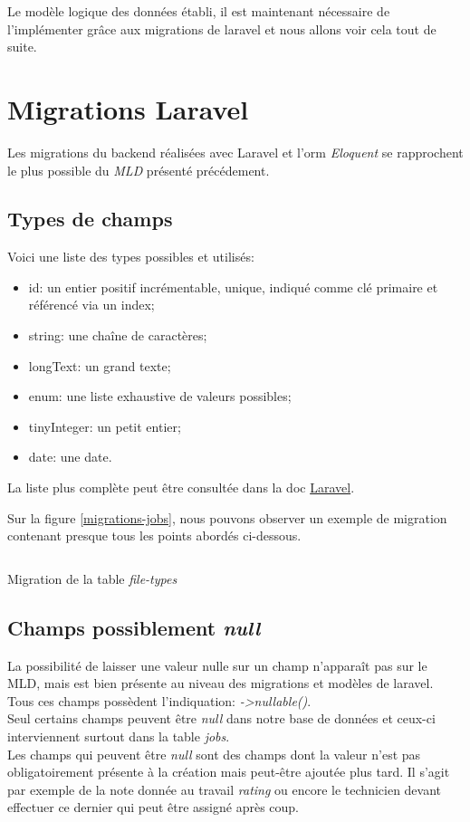 \documentclass[
    iai, %
    il, %
]{heig-tb}
\begin{document}
Le modèle logique des données établi, il est maintenant nécessaire de l'implémenter grâce aux migrations de \Gls{laravel} et nous allons voir cela tout de suite.

\section{Migrations Laravel}

Les migrations du \Gls{backend} réalisées avec Laravel et l'\Gls{orm} \emph{Eloquent} se rapprochent le plus possible du \emph{MLD} présenté précédement.

\subsection{Types de champs}
Voici une liste des types possibles et utilisés:
\begin{itemize}
    \item id: un entier positif incrémentable, unique, indiqué comme clé primaire et référencé via un index;
    \item string: une chaîne de caractères;
    \item longText: un grand texte;
    \item enum: une liste exhaustive de valeurs possibles;
    \item tinyInteger: un petit entier;
    \item date: une date.
\end{itemize}

La liste plus complète peut être consultée dans la doc \href{https://laravel.com/docs/9.x/migrations#available-column-types}{Laravel}.

Sur la figure \ref{migrations-jobs}, nous pouvons observer un exemple de migration contenant presque tous les points abordés ci-dessous.

\begin{listing}[h]
    \inputminted{php}{assets/code/16_create_jobs_table.php}
    \caption{Migration de la table \emph{file-types} \label{migrations-jobs}}
\end{listing}

\subsection{Champs possiblement \emph{null}}
La possibilité de laisser une valeur nulle sur un champ n'apparaît pas sur le MLD, mais est bien présente au niveau des migrations et modèles de \Gls{laravel}.\\
Tous ces champs possèdent l'indiquation: \emph{->nullable()}.\\
Seul certains champs peuvent être \emph{null} dans notre base de données et ceux-ci interviennent surtout dans la table \emph{jobs}.\\
Les champs qui peuvent être \emph{null} sont des champs dont la valeur n'est pas obligatoirement présente à la création mais peut-être ajoutée plus tard. Il s'agit par exemple de la note donnée au travail \emph{rating} ou encore le technicien devant effectuer ce dernier qui peut être assigné après coup.
\end{document}
